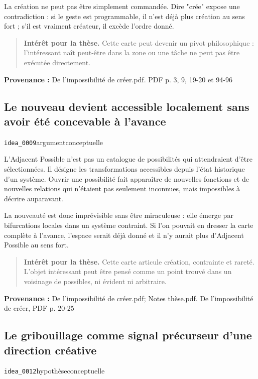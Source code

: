 \documentclass[10pt,a4paper]{article}
\begin{document}
La création ne peut pas être simplement commandée. Dire "crée" expose une contradiction : si le geste est programmable, il n'est déjà plus création au sens fort ; s'il est vraiment créateur, il excède l'ordre donné.

\begin{quote}
\textbf{Intérêt pour la thèse.} Cette carte peut devenir un pivot philosophique : l'intéressant naît peut-être dans la zone ou une tâche ne peut pas être exécutée directement.
\end{quote}
{\footnotesize\color{metadata}\textbf{Provenance :} De l'impossibilité de créer.pdf. PDF p. 3, 9, 19-20 et 94-96\par}

\subsection{Le nouveau devient accessible localement sans avoir été concevable à l'avance}
{\small\color{metadata} \texttt{idea\_0009}\quad\textbullet\quad argument\quad\textbullet\quad conceptuelle\par}

L'Adjacent Possible n'est pas un catalogue de possibilités qui attendraient d'être sélectionnées. Il désigne les transformations accessibles depuis l'état historique d'un système. Ouvrir une possibilité fait apparaître de nouvelles fonctions et de nouvelles relations qui n'étaient pas seulement inconnues, mais impossibles à décrire auparavant.

La nouveauté est donc imprévisible sans être miraculeuse : elle émerge par bifurcations locales dans un système contraint. Si l'on pouvait en dresser la carte complète à l'avance, l'espace serait déjà donné et il n'y aurait plus d'Adjacent Possible au sens fort.

\begin{quote}
\textbf{Intérêt pour la thèse.} Cette carte articule création, contrainte et rareté. L'objet intéressant peut être pensé comme un point trouvé dans un voisinage de possibles, ni évident ni arbitraire.
\end{quote}
{\footnotesize\color{metadata}\textbf{Provenance :} De l'impossibilité de créer.pdf; Notes thèse.pdf. De l'impossibilité de créer, PDF p. 20-25\par}

\subsection{Le gribouillage comme signal précurseur d'une direction créative}
{\small\color{metadata} \texttt{idea\_0012}\quad\textbullet\quad hypothèse\quad\textbullet\quad conceptuelle\par}
\end{document}
